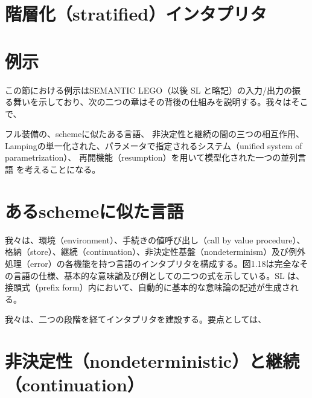 \documentclass[11pt, oneside]{jsbook}   	%
\begin{document}



\section{階層化（stratified）インタプリタ}

\newpage

\newpage

\newpage

\section{例示}
この節における例示はSEMANTIC LEGO（以後 SL と略記）の入力/出力の振る舞いを示しており、次の二つの章はその背後の仕組みを説明する。我々はそこで、

フル装備の、schemeに似たある言語、
非決定性と継続の間の三つの相互作用、
Lampingの単一化された、パラメータで指定されるシステム（unified system of parametrization）、
再開機能（resumption）を用いて模型化された一つの並列言語
を考えることになる。

\newpage

\newpage

\newpage

\newpage

\section{あるschemeに似た言語}
我々は、環境（environment）、手続きの値呼び出し（call by value procedure）、格納（store）、継続（continuation）、非決定性基盤（nondeterminism）及び例外処理（error）の各機能を持つ言語のインタプリタを構成する。図1.18は完全なその言語の仕様、基本的な意味論及び例としての二つの式を示している。SL は、接頭式（prefix form）内において、自動的に基本的な意味論の記述が生成される。

我々は、二つの段階を経てインタプリタを建設する。要点としては、

\section{非決定性（nondeterministic）と継続（continuation）}
\end{document}
